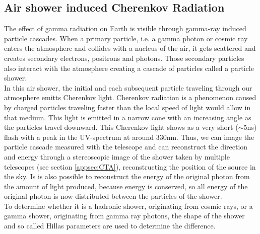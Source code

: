 \documentclass[12pt,article,type=msc,colorback,accentcolor=tud9c]{tudthesis}
\begin{document}
\subsection{Air shower induced Cherenkov Radiation}

\begin{wrapfigure}{R}{0.4\textwidth}
\centering
\texttt{[image: D:/OwnCloudData/00\_WriteUP/04\_Thesis/Pic/Proposal/Fig/\{gamma]}.jpg}
\caption{\label{fig:Cherenkov} The cone of Cherenkov light emitted by an extensive air shower. Picture from \cite{AsperaCTA}}
\end{wrapfigure}

The effect of gamma radiation on Earth is visible through gamma-ray induced particle cascades. When a primary particle, i.e. a gamma photon or cosmic ray enters the atmosphere and collides with a nucleus of the air, it gets scattered and creates secondary electrons, positrons and photons. Those secondary particles also interact with the atmosphere creating a cascade of particles called a particle shower.\\
In this air shower, the initial and each subsequent particle traveling through our atmosphere emitts Cherenkov light. Cherenkov radiation is a phenomenon caused by charged particles traveling faster than the local speed of light would allow in that medium. This light is emitted in a narrow cone with an increasing angle as the particles travel downward. This Cherenkov light shows as a very short ($\sim$5ns) flash with a peak in the UV-spectrum at around 330nm.
Thus, we can image the particle cascade measured with the telescope and can reconstruct the direction and energy through a stereoscopic image of the shower taken by multiple telescopes (see section {\ref{appsec:CTA}}), reconstructing the position of the source in the sky. Is is also possible to reconstruct the energy of the original photon from the amount of light produced, because energy is conserved, so all energy of the original photon is now distributed between the particles of the shower.\\
To determine whether it is a hadronic shower, originating from cosmic rays, or a gamma shower, originating from gamma ray photons, the shape of the shower and so called Hillas parameters are used to determine the difference.
\end{document}
